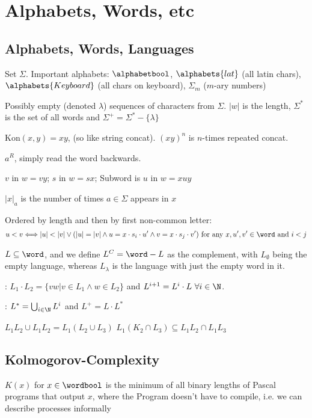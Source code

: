 \newsection
\section{Alphabets, Words, etc}
\subsection{Alphabets, Words, Languages}
 Set $\Sigma$.
Important alphabets: $\alphabetbool$, $\alphabets{lat}$ (all latin chars), $\alphabets{Keyboard}$ (all chars on keyboard), $\Sigma_m$ ($m$-ary numbers)

 Possibly empty (denoted $\lambda$) sequences of characters from $\Sigma$. $|w|$ is the length, 
$\Sigma^*$ is the set of all words and $\Sigma^+ = \Sigma^* - \{ \lambda \}$

 $\text{Kon}(x, y) = xy$, (so like string concat). $(xy)^n$ is $n$-times repeated concat.

 $a^R$, simply read the word backwards.

 $v$ in $w = vy$; $s$ in $w = sx$; Subword is $u$ in $w = xuy$

 $|x|_a$ is the number of times $a \in \Sigma$ appears in $x$

 Ordered by length and then by first non-common letter:
\rmvspace
\begin{align*}
    u < v \Longleftrightarrow |u| < |v| \lor (|u| = |v| \land u = x \cdot s_i \cdot u' \land v = x \cdot s_j \cdot v') \text{ for any } x, u', v' \in \word \text{ and } i < j
\end{align*}

\drmvspace
{} $L \subseteq \word$, and we define $L^C = \word - L$ as the complement, with $L_{\emptyset}$ being the empty language, 
whereas $L_\lambda$ is the language with just the empty word in it.

: $L_1 \cdot L_2 = \{ vw | v \in L_1 \land w \in L_2 \}$ and $L^{i + 1} = L^i \cdot L \ \forall i \in \N$.

: $L^* = \bigcup_{i \in \N} L^i$ and $L^+ = L \cdot L^*$


\inlinelemma $L_1L_2 \cup L_1 L_2 = L_1(L_2 \cup L_3)$
\inlinelemma $L_1(K_2 \cap L_3) \subseteq L_1 L_2 \cap L_1 L_3$


\subsection{Kolmogorov-Complexity}
 $K(x)$ for $x \in \wordbool$ is the minimum of all binary lengths of Pascal programs that output $x$, 
where the Program doesn't have to compile, i.e. we can describe processes informally

